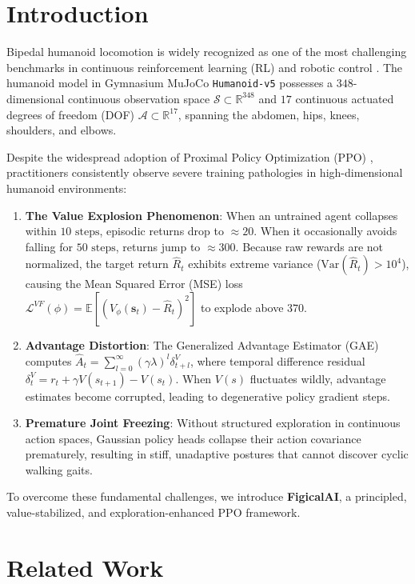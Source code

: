 \documentclass{article}
\begin{document}
\section{Introduction}
\label{sec:intro}
Bipedal humanoid locomotion is widely recognized as one of the most challenging benchmarks in continuous reinforcement learning (RL) and robotic control \citep{todorov2012mujoco, schulman2017proximal}. The humanoid model in Gymnasium MuJoCo \texttt{Humanoid-v5} possesses a $348$-dimensional continuous observation space $\mathcal{S} \subset \mathbb{R}^{348}$ and $17$ continuous actuated degrees of freedom (DOF) $\mathcal{A} \subset \mathbb{R}^{17}$, spanning the abdomen, hips, knees, shoulders, and elbows.

Despite the widespread adoption of Proximal Policy Optimization (PPO) \citep{schulman2017proximal}, practitioners consistently observe severe training pathologies in high-dimensional humanoid environments:
\begin{enumerate}
    \item \textbf{The Value Explosion Phenomenon}: When an untrained agent collapses within $10\text{ steps}$, episodic returns drop to $\approx 20$. When it occasionally avoids falling for $50\text{ steps}$, returns jump to $\approx 300$. Because raw rewards are not normalized, the target return $\hat{R}_t$ exhibits extreme variance ($\text{Var}(\hat{R}_t) > 10^4$), causing the Mean Squared Error (MSE) loss $\mathcal{L}^{VF}(\phi) = \mathbb{E}[(V_\phi(\mathbf{s}_t) - \hat{R}_t)^2]$ to explode above $370$.
    \item \textbf{Advantage Distortion}: The Generalized Advantage Estimator (GAE) computes $\hat{A}_t = \sum_{l=0}^\infty (\gamma \lambda)^l \delta_{t+l}^V$, where temporal difference residual $\delta_t^V = r_t + \gamma V(s_{t+1}) - V(s_t)$. When $V(s)$ fluctuates wildly, advantage estimates become corrupted, leading to degenerative policy gradient steps.
    \item \textbf{Premature Joint Freezing}: Without structured exploration in continuous action spaces, Gaussian policy heads collapse their action covariance prematurely, resulting in stiff, unadaptive postures that cannot discover cyclic walking gaits.
\end{enumerate}

To overcome these fundamental challenges, we introduce \textbf{FigicalAI}, a principled, value-stabilized, and exploration-enhanced PPO framework.

\section{Related Work}
\label{sec:related}
\end{document}
